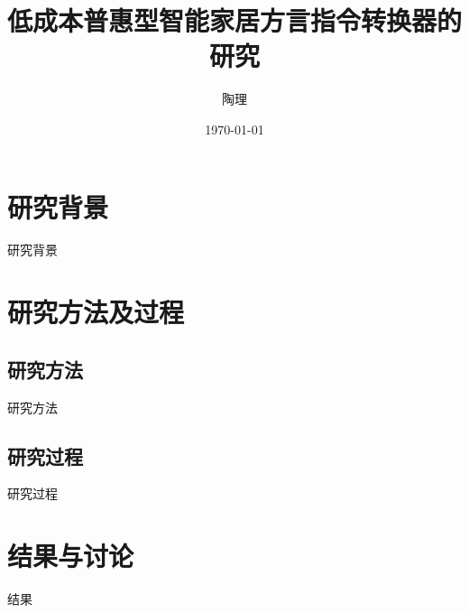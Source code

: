 \documentclass{beamer}
\title{低成本普惠型智能家居方言指令转换器的研究}
\author{陶理}
\date{\today}
\begin{document}
\maketitle
\section{研究背景}
\begin{frame}{研究背景}
\end{frame}
\section{研究方法及过程}
\subsection{研究方法}
\begin{frame}{研究方法}
\end{frame}
\subsection{研究过程}
\begin{frame}{研究过程}
\end{frame}
\section{结果与讨论}
\begin{frame}{结果}
\end{frame}
\end{document}
